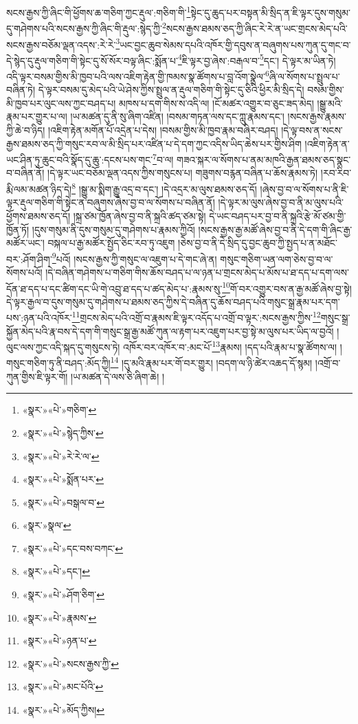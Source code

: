 སངས་རྒྱས་ཀྱི་ཞིང་གི་ཕྱོགས་ཆ་གཅིག་ཀྱང་རྡུལ་:གཅིག་གི་\footnote{«སྣར་»«པེ་»གཅིག་}སྟེང་དུ་ཆུད་པར་བསྟན་མི་སྲིད་ན་ཇི་ལྟར་དུས་གསུམ་དུ་གཤེགས་པའི་སངས་རྒྱས་ཀྱི་ཞིང་གི་རྡུལ་:སྙེད་ཀྱི་\footnote{«སྣར་»«པེ་»སྙེད་ཀྱིས་}སངས་རྒྱས་ཐམས་ཅད་ཀྱི་ཞིང་རེ་རེ་ན་ཡང་གྲངས་མེད་པའི་སངས་རྒྱས་བཅོམ་ལྡན་འདས་:རེ་རེ་\footnote{«སྣར་»«པེ་»རེ་རེ་ལ་}ཡང་བྱང་ཆུབ་སེམས་དཔའི་འཁོར་གྱི་དབུས་ན་བཞུགས་པས་ཀུན་དུ་གང་བ་དེ་སྙེད་དུ་རྡུལ་གཅིག་གི་སྟེང་དུ་སོ་སོར་བལྟ་ཞིང་:སྨོན་པ་\footnote{«སྣར་»«པེ་»སྨོན་པར་}ཇི་ལྟར་བྱ་ཞེས་:བརྒལ་བ་\footnote{«སྣར་»«པེ་»བསྒལ་བ་}དང་། དེ་ལྟར་མ་ཡིན་ཏེ། འདི་ལྟར་བསམ་གྱིས་མི་ཁྱབ་པའི་ལས་འཇིག་རྟེན་གྱི་ཁམས་སྣ་ཚོགས་པ་བླ་འོག་སྣྲེལ་\footnote{«སྣར་»སྣལ་}ཞི་ལ་སོགས་པ་སྤྲུལ་པ་བཞིན་ཏེ། དེ་ལྟར་བསམ་དུ་མེད་པའི་ཡེ་ཤེས་ཀྱིས་སྤྲུལ་ན་རྡུལ་གཅིག་གི་སྟེང་དུ་ཅིའི་ཕྱིར་མི་སྲིད་དེ། བསམ་གྱིས་མི་ཁྱབ་པར་ལུང་ལས་ཀྱང་བཤད་པ། མཁས་པ་དག་གིས་ས་འདི་ལ། །ངོ་མཚར་འགྱུར་བ་ཅུང་ཟད་མེད། །སྒྱུ་མའི་རྣམ་པར་གྱུར་པ་ལ། །ཡ་མཚན་དུ་ནི་སུ་ཞིག་འཛིན། །བསམ་གཏན་ལས་དང་ཀླུ་རྣམས་དང་། །སངས་རྒྱས་རྣམས་ཀྱི་ཆེ་བ་ཉིད། །འཇིག་རྟེན་མགོན་པོ་འདྲེན་པ་དེས། །བསམ་གྱིས་མི་ཁྱབ་རྣམ་བཞིར་བཤད། །དེ་ལྟ་བས་ན་སངས་རྒྱས་ཐམས་ཅད་ཀྱི་གསུང་རབ་ལ་མི་སྲིད་པར་འཛིན་པ་དེ་དག་ཀྱང་འདིས་ཡིད་ཆེས་པར་གྱིས་ཤིག །འཇིག་རྟེན་ན་ཡང་ཤིན་ཏུ་ཆུང་བའི་སྣོད་དུ་ཆུ་:དངས་པས་གང་\footnote{«སྣར་»«པེ་»དང་བས་བཀང་}བ་ལ། གཟའ་སྐར་ལ་སོགས་པ་ནམ་མཁའི་རྒྱན་ཐམས་ཅད་སྣང་བ་བཞིན་ནོ། །དེ་ལྟར་ཡང་བཅོམ་ལྡན་འདས་ཀྱིས་གསུངས་པ། གཟུགས་བརྙན་བཞིན་པ་ཆོས་རྣམས་ཏེ། །རབ་རིབ་རྨི་ལམ་མཚན་ཉིད་དེ།\footnote{«སྣར་»«པེ་»དང་།} །སྒྱུ་མ་སྨིག་རྒྱུ་འདྲ་བ་དང་། །དེ་འདྲར་མ་ལུས་ཐམས་ཅད་དོ། །ཞེས་བྱ་བ་ལ་སོགས་པ་ནི་ཇི་ལྟར་རྡུལ་གཅིག་གི་སྟེང་ན་བཞུགས་ཞེས་བྱ་བ་ལ་སོགས་པ་བཞིན་ནོ། །དེ་ལྟར་མ་ལུས་ཞེས་བྱ་བ་ནི་མ་ལུས་པའི་ཕྱོགས་ཐམས་ཅད་དོ། །སྐྲ་ཙམ་ཁྱོན་ཞེས་བྱ་བ་ནི་སྐྲའི་ཚད་ཙམ་སྟེ། དེ་ཡང་བཤད་པར་བྱ་བ་ནི་སྐྲའི་རྩེ་མོ་ཙམ་གྱི་ཁྱོན་ཏོ། །དུས་གསུམ་ནི་དུས་གསུམ་དུ་གཤེགས་པ་རྣམས་ཀྱིའོ། །སངས་རྒྱས་རྒྱ་མཚོ་ཞེས་བྱ་བ་ནི་དེ་དག་གི་ཞིང་རྒྱ་མཚོར་ཡང་། བསྐལ་པ་རྒྱ་མཚོར་སྤྱོད་ཅིང་རབ་ཏུ་འཇུག །ཅེས་བྱ་བ་ནི་དེ་སྲིད་དུ་བྱང་ཆུབ་ཀྱི་སྤྱད་པ་ན་མཐོང་བར་:ཤོག་ཤིག་\footnote{«སྣར་»«པེ་»ཤོག་ཅིག་}པའོ། །སངས་རྒྱས་ཀྱི་གསུང་ལ་འཇུག་པ་དེ་གང་ཞེ་ན། གསུང་གཅིག་ཡན་ལག་ཅེས་བྱ་བ་ལ་སོགས་པའོ། །དེ་བཞིན་གཤེགས་པ་གཅིག་གིས་ཆོས་བཤད་པ་ལ་ཉན་པ་གྲངས་མེད་པ་མོས་པ་ཐ་དད་པ་དག་ལས་དོན་ཐ་དད་པ་དང་ཚིག་དང་ཡི་གེ་འབྲུ་ཐ་དད་པ་ཚད་མེད་པ་:རྣམས་སུ་\footnote{«སྣར་»«པེ་»རྣམས་}གོ་བར་འགྱུར་བས་ན་རྒྱ་མཚོ་ཞེས་བྱ་སྟེ། དེ་ལྟར་རྒྱལ་བ་དུས་གསུམ་དུ་གཤེགས་པ་ཐམས་ཅད་ཀྱིས་དེ་བཞིན་དུ་ཆོས་བཤད་པའི་གསུང་སྒྲ་རྣམ་པར་དག་པས་:ཉན་པའི་འཁོར་\footnote{«སྣར་»«པེ་»ཉན་པ་}གྲངས་མེད་པའི་འགྲོ་བ་རྣམས་ཇི་ལྟར་འདོད་པ་འགྲོ་བ་ལྟར་:སངས་རྒྱས་ཀྱིས་\footnote{«སྣར་»«པེ་»སངས་རྒྱས་ཀྱི་}གསུང་སྒྲ་སྐྱོན་མེད་པའི་རྣ་བས་དེ་དག་གི་གསུང་སྒྲ་རྒྱ་མཚོ་ཀུན་ལ་རྟག་པར་འཇུག་པར་བྱ་སྟེ་མ་ལུས་པར་ཡིད་ལ་བྱའོ། །ལུང་ལས་ཀྱང་འདི་སྐད་དུ་གསུངས་ཏེ། འཁོར་བར་འཁོར་བ་:མང་པོ་\footnote{«སྣར་»«པེ་»མང་པོའི་}རྣམས། །དད་པའི་རྣམ་པ་སྣ་ཚོགས་ལ། །གསུང་གཅིག་ཏུ་ནི་བཤད་:མོད་ཀྱི།\footnote{«སྣར་»«པེ་»མོད་ཀྱིས།} །དུ་མའི་རྣམ་པར་གོ་བར་གྱུར། །བདག་ལ་ཉི་ཚེར་འཆད་དོ་སྙམ། །འགྲོ་བ་ཀུན་གྱིས་ཇི་ལྟར་གོ། །ཡ་མཚན་དེ་ལས་ཅི་ཞིག་ཆེ། །
